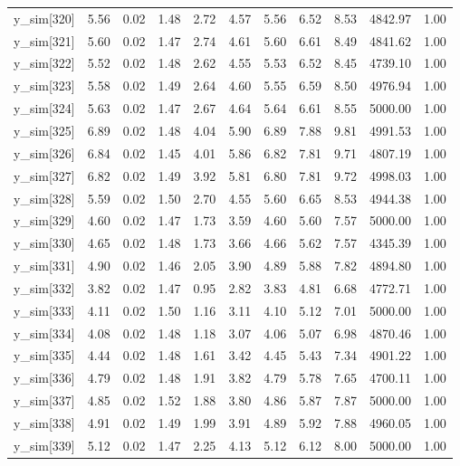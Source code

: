 \begin{table}[ht]
\begin{tabular}{rrrrrrrrrrr}
  y\_sim[320] & 5.56 & 0.02 & 1.48 & 2.72 & 4.57 & 5.56 & 6.52 & 8.53 & 4842.97 & 1.00 \\ 
  y\_sim[321] & 5.60 & 0.02 & 1.47 & 2.74 & 4.61 & 5.60 & 6.61 & 8.49 & 4841.62 & 1.00 \\ 
  y\_sim[322] & 5.52 & 0.02 & 1.48 & 2.62 & 4.55 & 5.53 & 6.52 & 8.45 & 4739.10 & 1.00 \\ 
  y\_sim[323] & 5.58 & 0.02 & 1.49 & 2.64 & 4.60 & 5.55 & 6.59 & 8.50 & 4976.94 & 1.00 \\ 
  y\_sim[324] & 5.63 & 0.02 & 1.47 & 2.67 & 4.64 & 5.64 & 6.61 & 8.55 & 5000.00 & 1.00 \\ 
  y\_sim[325] & 6.89 & 0.02 & 1.48 & 4.04 & 5.90 & 6.89 & 7.88 & 9.81 & 4991.53 & 1.00 \\ 
  y\_sim[326] & 6.84 & 0.02 & 1.45 & 4.01 & 5.86 & 6.82 & 7.81 & 9.71 & 4807.19 & 1.00 \\ 
  y\_sim[327] & 6.82 & 0.02 & 1.49 & 3.92 & 5.81 & 6.80 & 7.81 & 9.72 & 4998.03 & 1.00 \\ 
  y\_sim[328] & 5.59 & 0.02 & 1.50 & 2.70 & 4.55 & 5.60 & 6.65 & 8.53 & 4944.38 & 1.00 \\ 
  y\_sim[329] & 4.60 & 0.02 & 1.47 & 1.73 & 3.59 & 4.60 & 5.60 & 7.57 & 5000.00 & 1.00 \\ 
  y\_sim[330] & 4.65 & 0.02 & 1.48 & 1.73 & 3.66 & 4.66 & 5.62 & 7.57 & 4345.39 & 1.00 \\ 
  y\_sim[331] & 4.90 & 0.02 & 1.46 & 2.05 & 3.90 & 4.89 & 5.88 & 7.82 & 4894.80 & 1.00 \\ 
  y\_sim[332] & 3.82 & 0.02 & 1.47 & 0.95 & 2.82 & 3.83 & 4.81 & 6.68 & 4772.71 & 1.00 \\ 
  y\_sim[333] & 4.11 & 0.02 & 1.50 & 1.16 & 3.11 & 4.10 & 5.12 & 7.01 & 5000.00 & 1.00 \\ 
  y\_sim[334] & 4.08 & 0.02 & 1.48 & 1.18 & 3.07 & 4.06 & 5.07 & 6.98 & 4870.46 & 1.00 \\ 
  y\_sim[335] & 4.44 & 0.02 & 1.48 & 1.61 & 3.42 & 4.45 & 5.43 & 7.34 & 4901.22 & 1.00 \\ 
  y\_sim[336] & 4.79 & 0.02 & 1.48 & 1.91 & 3.82 & 4.79 & 5.78 & 7.65 & 4700.11 & 1.00 \\ 
  y\_sim[337] & 4.85 & 0.02 & 1.52 & 1.88 & 3.80 & 4.86 & 5.87 & 7.87 & 5000.00 & 1.00 \\ 
  y\_sim[338] & 4.91 & 0.02 & 1.49 & 1.99 & 3.91 & 4.89 & 5.92 & 7.88 & 4960.05 & 1.00 \\ 
  y\_sim[339] & 5.12 & 0.02 & 1.47 & 2.25 & 4.13 & 5.12 & 6.12 & 8.00 & 5000.00 & 1.00 \\ 

\end{tabular}
\end{table}
